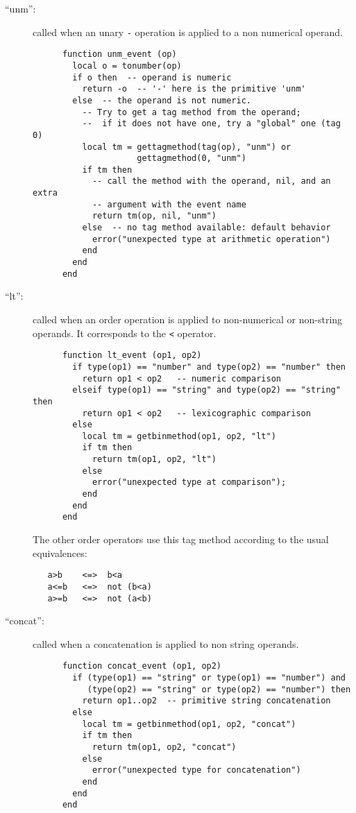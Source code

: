 \documentclass[11pt]{article}
\begin{document}
\begin{description}
\item[``unm'':]
called when an unary \verb|-| operation is applied to a non numerical operand.
\begin{verbatim}
      function unm_event (op)
        local o = tonumber(op)
        if o then  -- operand is numeric
          return -o  -- '-' here is the primitive 'unm'
        else  -- the operand is not numeric.
          -- Try to get a tag method from the operand;
          --  if it does not have one, try a "global" one (tag 0)
          local tm = gettagmethod(tag(op), "unm") or
                     gettagmethod(0, "unm")
          if tm then
            -- call the method with the operand, nil, and an extra
            -- argument with the event name
            return tm(op, nil, "unm")
          else  -- no tag method available: default behavior
            error("unexpected type at arithmetic operation")
          end
        end
      end
\end{verbatim}

\item[``lt'':]
called when an order operation is applied to non-numerical
or non-string operands.
It corresponds to the \verb|<| operator.
\begin{verbatim}
      function lt_event (op1, op2)
        if type(op1) == "number" and type(op2) == "number" then
          return op1 < op2   -- numeric comparison
        elseif type(op1) == "string" and type(op2) == "string" then
          return op1 < op2   -- lexicographic comparison
        else
          local tm = getbinmethod(op1, op2, "lt")
          if tm then
            return tm(op1, op2, "lt")
          else
            error("unexpected type at comparison");
          end
        end
      end
\end{verbatim}
The other order operators use this tag method according to the
usual equivalences:
\begin{verbatim}
   a>b    <=>  b<a
   a<=b   <=>  not (b<a)
   a>=b   <=>  not (a<b)
\end{verbatim}

\item[``concat'':]
called when a concatenation is applied to non string operands.
\begin{verbatim}
      function concat_event (op1, op2)
        if (type(op1) == "string" or type(op1) == "number") and
           (type(op2) == "string" or type(op2) == "number") then
          return op1..op2  -- primitive string concatenation
        else
          local tm = getbinmethod(op1, op2, "concat")
          if tm then
            return tm(op1, op2, "concat")
          else
            error("unexpected type for concatenation")
          end
        end
      end
\end{verbatim}


\end{description}
\end{document}
